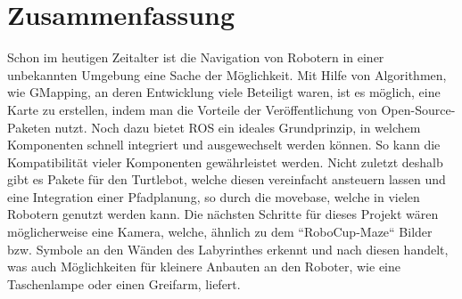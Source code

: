 \section{Zusammenfassung}
{
	Schon im heutigen Zeitalter ist die Navigation von Robotern in einer unbekannten Umgebung eine Sache der Möglichkeit. Mit Hilfe von Algorithmen, wie \zb GMapping, an deren Entwicklung viele Beteiligt waren, ist es möglich, eine Karte zu erstellen, indem man die Vorteile der Veröffentlichung von Open-Source-Paketen nutzt. Noch dazu bietet ROS ein ideales Grundprinzip, in welchem Komponenten schnell integriert und ausgewechselt werden können. So kann die Kompatibilität vieler Komponenten gewährleistet werden. Nicht zuletzt deshalb gibt es Pakete für den Turtlebot, welche diesen vereinfacht ansteuern lassen und eine Integration einer Pfadplanung, so \zb durch die move\textunderscore base, welche in vielen Robotern genutzt werden kann.
	Die nächsten Schritte für dieses Projekt wären möglicherweise eine Kamera, welche, ähnlich zu dem ``RoboCup-Maze`` Bilder bzw. Symbole an den Wänden des Labyrinthes erkennt und nach diesen handelt, was auch Möglichkeiten für kleinere Anbauten an den Roboter, wie \zb eine Taschenlampe oder einen Greifarm, liefert.
}